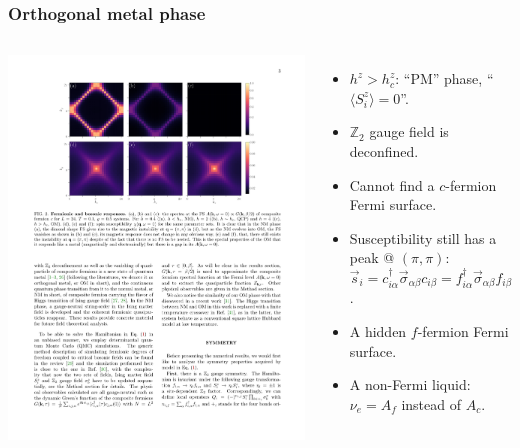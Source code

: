 \documentclass[xcolor=table, 10pt, aspectratio=43]{beamer}
\begin{document}
\begin{frame}
\frametitle{Orthogonal metal phase}
\begin{columns}
	\includegraphics[width=.9\columnwidth]{om}
	\begin{itemize}
	\item $h^z > h_c^z$: ``PM'' phase, ``$\langle S_i^z\rangle=0$''.
	\item $\mathbb Z_2$ gauge field is deconfined.
	\item Cannot find a $c$-fermion Fermi surface.
	\item Susceptibility still has a peak @ $(\pi,\pi)$: $\vec s_i= c_{i\alpha}^\dagger\vec\sigma_{\alpha\beta}c_{i\beta}
	= f_{i\alpha}^\dagger\vec\sigma_{\alpha\beta}f_{i\beta}$.
	\item A hidden $f$-fermion Fermi surface.
	\item A non-Fermi liquid: $\nu_e = A_f$ instead of $A_c$.
	\end{itemize}
\end{columns}
\end{frame}
\end{document}
